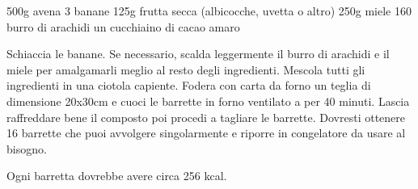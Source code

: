 \begin{ingreds}
	500g avena 
	3 banane 
	125g frutta secca (albicocche, uvetta o altro)
	250g miele 
	160 burro di arachidi 
	un cucchiaino di cacao amaro 

\end{ingreds}

\begin{method}
	Schiaccia le banane. Se necessario, scalda leggermente il burro di arachidi e il miele per amalgamarli meglio al resto degli ingredienti. Mescola tutti gli ingredienti in una ciotola capiente. Fodera con carta da forno un teglia di dimensione 20x30cm e cuoci le barrette in forno ventilato a  per 40 minuti. Lascia raffreddare bene il composto poi procedi a tagliare le barrette. Dovresti ottenere 16 barrette che puoi avvolgere singolarmente e riporre in congelatore da usare al bisogno.
	
Ogni barretta dovrebbe avere circa 256 kcal.
\end{method}




